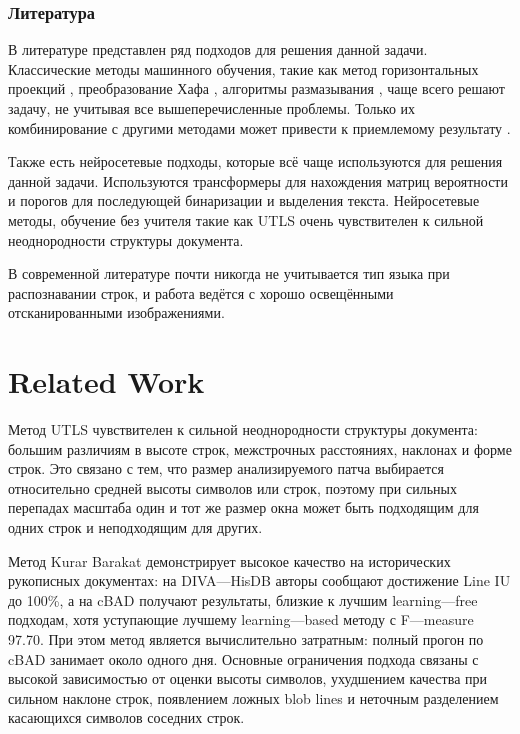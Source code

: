 \documentclass{article}
\begin{document}
\subsubsection{Литература}

В литературе представлен ряд подходов для решения данной задачи. Классические методы машинного обучения, такие как метод горизонтальных проекций \cite{manmatha-2005}, преобразование Хафа \cite{likforman-1995}, алгоритмы размазывания \cite{shi-2004}, чаще всего решают задачу, не учитывая все вышеперечисленные проблемы. Только их комбинирование с другими методами может привести к приемлемому результату \cite{Louloudis-2008}.

Также есть нейросетевые подходы, которые всё чаще \cite{louloudis-2025} используются для решения данной задачи. \cite{Liao2022} Используются трансформеры для нахождения матриц вероятности и порогов для последующей бинаризации и выделения текста. Нейросетевые методы, обучение без учителя такие как UTLS \cite{barakat-2020-utls} очень чувствителен к сильной неоднородности структуры документа.


В современной литературе почти никогда не учитывается тип языка при распознавании строк, и работа ведётся с хорошо освещёнными отсканированными изображениями.

\section{Related Work}\label{sec:rw}

Метод UTLS \cite{barakat-2020-utls} чувствителен к сильной неоднородности структуры документа: большим различиям в высоте строк, межстрочных расстояниях, наклонах и форме строк. Это связано с тем, что размер анализируемого патча выбирается относительно средней высоты символов или строк, поэтому при сильных перепадах масштаба один и тот же размер окна может быть подходящим для одних строк и неподходящим для других.

Метод Kurar Barakat \cite{barakat-2020-learning-free} демонстрирует высокое качество на исторических рукописных документах: на DIVA—HisDB авторы сообщают достижение Line IU до 100\%, а на cBAD получают результаты, близкие к лучшим learning—free подходам, хотя уступающие лучшему learning—based методу с F—measure 97.70. При этом метод является вычислительно затратным: полный прогон по cBAD занимает около одного дня. Основные ограничения подхода связаны с высокой зависимостью от оценки высоты символов, ухудшением качества при сильном наклоне строк, появлением ложных blob lines и неточным разделением касающихся символов соседних строк.
\end{document}
